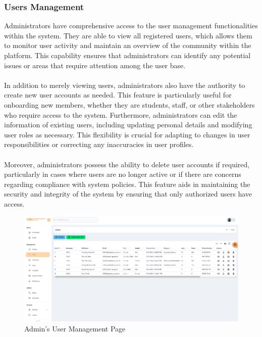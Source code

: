 	\subsubsection{Users Management}
	Administrators have comprehensive access to the user management functionalities within the system. They are able to view all registered users, which allows them to monitor user activity and maintain an overview of the community within the platform. This capability ensures that administrators can identify any potential issues or areas that require attention among the user base. \\ \\ 
	In addition to merely viewing users, administrators also have the authority to create new user accounts as needed. This feature is particularly useful for onboarding new members, whether they are students, staff, or other stakeholders who require access to the system. Furthermore, administrators can edit the information of existing users, including updating personal details and modifying user roles as necessary. This flexibility is crucial for adapting to changes in user responsibilities or correcting any inaccuracies in user profiles. \\ \\
	Moreover, administrators possess the ability to delete user accounts if required, particularly in cases where users are no longer active or if there are concerns regarding compliance with system policies. This feature aids in maintaining the security and integrity of the system by ensuring that only authorized users have access.
	
	\begin{figure}[H]
		\centering
		\includegraphics[width=1\linewidth]{graphics/gui/admin/user-mng}
		\caption{Admin's User Management Page}
		\label{fig:gui-ad-user-mng}
	\end{figure}
	
